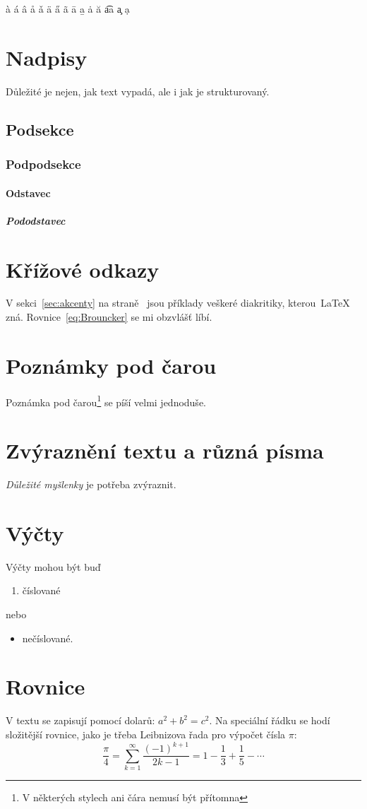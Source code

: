 \documentclass{article}
\begin{document}
	\`a \'a \^a \r a \v a \"a  \H a
	\~a \=a \b a \.a \u a \t{aa} \c a \d a
	
	\section{Nadpisy}
		Důležité je nejen, jak text vypadá, ale i jak je strukturovaný.
	\subsection{Podsekce}
	\subsubsection{Podpodsekce}
	\paragraph{Odstavec}
	\subparagraph{Pododstavec}	
	
	\section{Křížové odkazy}
	V sekci~\ref{sec:akcenty} na straně~\pageref{sec:akcenty} jsou příklady veškeré diakritiky, kterou~\LaTeX{} zná.
	Rovnice~\eqref{eq:Brouncker} se mi obzvlášť líbí.
	
	\section{Poznámky pod čarou}
	Poznámka pod čarou\footnote{V některých stylech ani čára nemusí být přítomna} se píší velmi jednoduše.
	
	\section{Zvýraznění textu a různá písma}
	\emph{Důležité myšlenky} je potřeba zvýraznit.
	
	\section{Výčty}
	Výčty mohou být buď
	\begin{enumerate}
		\item číslované
	\end{enumerate}
	nebo
	\begin{itemize}
		\item nečíslované.
	\end{itemize}
	
	\section{Rovnice}
	V textu se zapisují pomocí dolarů: $a^2+b^2=c^2$.
	Na speciální řádku se hodí složitější rovnice, jako je třeba Leibnizova řada pro výpočet čísla $\pi$:
	\begin{equation}
		\frac{\pi}{4}=\sum_{k=1}^{\infty}\frac{(-1)^{k+1}}{2k-1}
			=1-\frac{1}{3}+\frac{1}{5}-\dotsb
	\end{equation}
	
\end{document}
